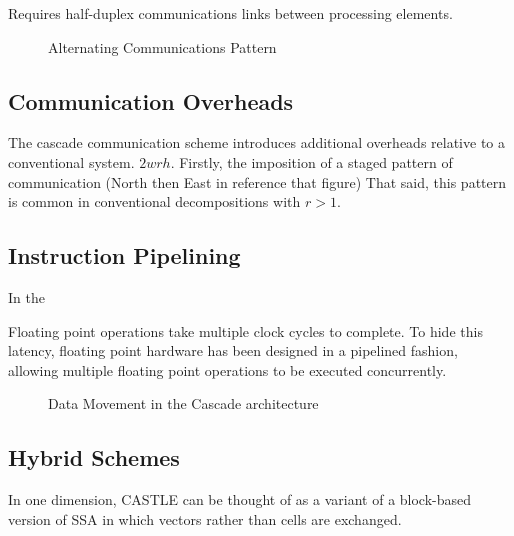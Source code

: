 Requires half-duplex communications links between processing elements.
\begin{figure}
  \centering
  
  \caption{Alternating Communications Pattern}
  \label{fig:alternatingcomms}
\end{figure}


\subsection{Communication Overheads}
The cascade communication scheme introduces additional overheads relative to a conventional system. $2wrh$.
Firstly, the imposition of a staged pattern of communication (North then East in reference that figure) 
That said, this pattern is common in conventional decompositions with $r>1$.




\subsection{Instruction Pipelining}

In the 


Floating point operations take multiple clock cycles to complete.
To hide this latency, floating point hardware has been designed in a pipelined fashion, allowing multiple floating point operations to be executed concurrently.


\begin{figure}
  \centering
  
  \caption{Data Movement in the Cascade architecture}
  \label{fig:cascade_placement}
\end{figure}



\subsection{Hybrid Schemes}
In one dimension, CASTLE can be thought of as a variant of a block-based version of SSA in which vectors rather than cells are exchanged.
